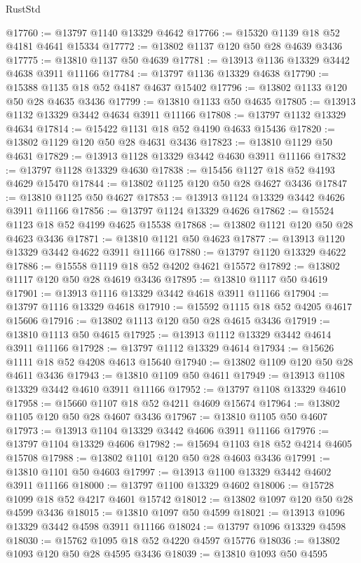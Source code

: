 \begin{lexlean}{RustStd}
\begin{coremodule}
@17760 := @13797 @1140 @13329 @4642
@17766 := @15320 @1139 @18 @52 @4181 @4641 @15334
@17772 := @13802 @1137 @120 @50 @28 @4639 @3436
@17775 := @13810 @1137 @50 @4639
@17781 := @13913 @1136 @13329 @3442 @4638 @3911 @11166
@17784 := @13797 @1136 @13329 @4638
@17790 := @15388 @1135 @18 @52 @4187 @4637 @15402
@17796 := @13802 @1133 @120 @50 @28 @4635 @3436
@17799 := @13810 @1133 @50 @4635
@17805 := @13913 @1132 @13329 @3442 @4634 @3911 @11166
@17808 := @13797 @1132 @13329 @4634
@17814 := @15422 @1131 @18 @52 @4190 @4633 @15436
@17820 := @13802 @1129 @120 @50 @28 @4631 @3436
@17823 := @13810 @1129 @50 @4631
@17829 := @13913 @1128 @13329 @3442 @4630 @3911 @11166
@17832 := @13797 @1128 @13329 @4630
@17838 := @15456 @1127 @18 @52 @4193 @4629 @15470
@17844 := @13802 @1125 @120 @50 @28 @4627 @3436
@17847 := @13810 @1125 @50 @4627
@17853 := @13913 @1124 @13329 @3442 @4626 @3911 @11166
@17856 := @13797 @1124 @13329 @4626
@17862 := @15524 @1123 @18 @52 @4199 @4625 @15538
@17868 := @13802 @1121 @120 @50 @28 @4623 @3436
@17871 := @13810 @1121 @50 @4623
@17877 := @13913 @1120 @13329 @3442 @4622 @3911 @11166
@17880 := @13797 @1120 @13329 @4622
@17886 := @15558 @1119 @18 @52 @4202 @4621 @15572
@17892 := @13802 @1117 @120 @50 @28 @4619 @3436
@17895 := @13810 @1117 @50 @4619
@17901 := @13913 @1116 @13329 @3442 @4618 @3911 @11166
@17904 := @13797 @1116 @13329 @4618
@17910 := @15592 @1115 @18 @52 @4205 @4617 @15606
@17916 := @13802 @1113 @120 @50 @28 @4615 @3436
@17919 := @13810 @1113 @50 @4615
@17925 := @13913 @1112 @13329 @3442 @4614 @3911 @11166
@17928 := @13797 @1112 @13329 @4614
@17934 := @15626 @1111 @18 @52 @4208 @4613 @15640
@17940 := @13802 @1109 @120 @50 @28 @4611 @3436
@17943 := @13810 @1109 @50 @4611
@17949 := @13913 @1108 @13329 @3442 @4610 @3911 @11166
@17952 := @13797 @1108 @13329 @4610
@17958 := @15660 @1107 @18 @52 @4211 @4609 @15674
@17964 := @13802 @1105 @120 @50 @28 @4607 @3436
@17967 := @13810 @1105 @50 @4607
@17973 := @13913 @1104 @13329 @3442 @4606 @3911 @11166
@17976 := @13797 @1104 @13329 @4606
@17982 := @15694 @1103 @18 @52 @4214 @4605 @15708
@17988 := @13802 @1101 @120 @50 @28 @4603 @3436
@17991 := @13810 @1101 @50 @4603
@17997 := @13913 @1100 @13329 @3442 @4602 @3911 @11166
@18000 := @13797 @1100 @13329 @4602
@18006 := @15728 @1099 @18 @52 @4217 @4601 @15742
@18012 := @13802 @1097 @120 @50 @28 @4599 @3436
@18015 := @13810 @1097 @50 @4599
@18021 := @13913 @1096 @13329 @3442 @4598 @3911 @11166
@18024 := @13797 @1096 @13329 @4598
@18030 := @15762 @1095 @18 @52 @4220 @4597 @15776
@18036 := @13802 @1093 @120 @50 @28 @4595 @3436
@18039 := @13810 @1093 @50 @4595

\end{coremodule}
\end{lexlean}
